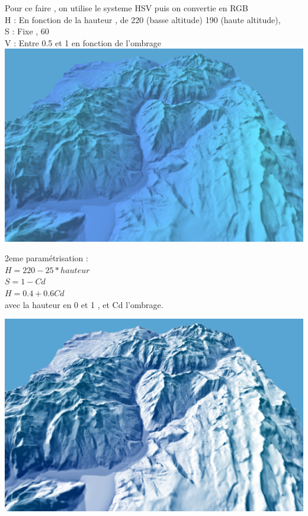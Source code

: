 \documentclass[a4paper]{article}
\begin{document}
Pour ce faire , on utilise le systeme HSV puis on convertie en RGB \\
H : En fonction de la hauteur , de 220 (basse altitude) 190 (haute altitude), \\
S : Fixe , 60 \\
V : Entre 0.5 et 1 en fonction de l'ombrage \\


\includegraphics[width=1.0\textwidth]{Images/Essais/Essai_17.png}

2eme paramétrisation : \\
$H = 220 - 25*hauteur$ \\
$S = 1 - Cd$ \\
$H = 0.4 + 0.6Cd$ \\
avec la hauteur en 0 et 1 , et Cd l'ombrage.

\includegraphics[width=1.0\textwidth]{Images/Essais/Essai_17_2.png}
\end{document}

